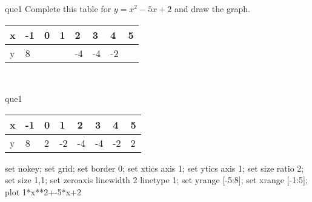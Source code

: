 \documentclass[13.5pt, varwidth=true]{beamer}
\begin{document}
\begin{frame}[shrink=19,fragile]
	\begin{beamercolorbox}[rounded=true, left, shadow=true,wd=14.8cm]{que1}
		 Complete this table for $y = x^{2} - 5x + 2$ and draw the graph. \\[0.3cm] \renewcommand{\arraystretch}{1.2}\begin{tabular}{|C|C|C|C|C|C|C|C|} \hline x & -1 & 0 & 1 & 2 & 3 & 4 & 5 \\ \hline y & 8 &  &  & -4 & -4 & -2 & \\ \hline \end{tabular}\\[0.3cm]
	\end{beamercolorbox}
\end{frame}
\begin{frame}[shrink=19,fragile]
	\begin{beamercolorbox}[rounded=true, left, shadow=true,wd=14.8cm]{que1}
		\renewcommand{\arraystretch}{1.2}\begin{tabular}{|C|C|C|C|C|C|C|C|} \hline x & -1 & 0 & 1 & 2 & 3 & 4 & 5 \\ \hline y & 8 & 2 & -2 & -4 & -4 & -2 & 2\\ \hline \end{tabular}\begin{gnuplot}[terminal=pdf] set nokey; set grid; set border 0; set xtics axis 1; set ytics axis 1; set size ratio 2; set size 1,1; set zeroaxis linewidth 2 linetype 1; set yrange [-5:8]; set xrange [-1:5]; plot 1*x**2+-5*x+2 \end{gnuplot}
	\end{beamercolorbox}
\end{frame}
\end{document}
